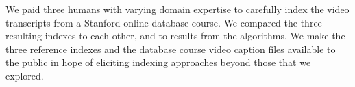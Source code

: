 We paid three humans with varying domain expertise to carefully index
the video transcripts from a Stanford online database course.  We
compared the three resulting indexes to each other, and to results
from the algorithms. We make the three reference indexes and the
database course video caption files available to the public in hope of
eliciting indexing approaches beyond those that we explored.






